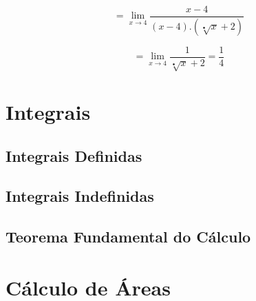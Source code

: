 \documentclass[ ]{article}
\begin{document}
	$$= \lim_{x\to 4}\dfrac{x-4}{(x-4).(\sqrt[•]{x}+2)}$$
	
	$$= \lim_{x\to 4}\dfrac{1}{\sqrt[•]{x}+2} = \dfrac{1}{4}$$
	
	
\newpage
\section{Integrais}
	\subsection{Integrais Definidas}
	\subsection{Integrais Indefinidas}
	\subsection{Teorema Fundamental do Cálculo}
\section{Cálculo de Áreas}
	
\end{document}
